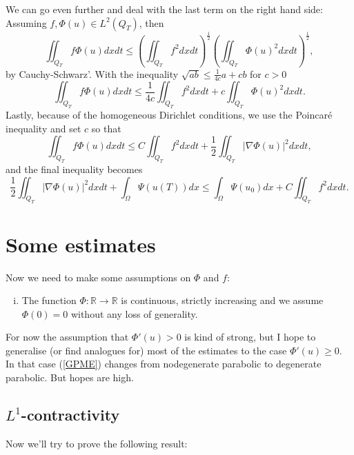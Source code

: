 \documentclass[11pt, a4paper]{article}
\begin{document}
\begin{obs}
We can go even further and deal with the last term on the right hand side: Assuming $f,\Phi(u) \in L^2(Q_T)$, then
\begin{equation*}
\iint_{Q_T} f\Phi(u)dxdt \leq \left(\iint_{Q_T} f^2 dxdt\right)^\frac{1}{2}\left(\iint_{Q_T} \Phi(u)^2 dxdt\right)^\frac{1}{2},
\end{equation*}
by Cauchy-Schwarz'. With the inequality $\sqrt{ab} \leq \frac{1}{4c}a + cb$ for $c>0$
\begin{equation*}
\iint_{Q_T} f\Phi(u)dxdt \leq \frac{1}{4c}\iint_{Q_T}f^2dxdt + c\iint_{Q_T}\Phi(u)^2dxdt.
\end{equation*}
Lastly, because of the homogeneous Dirichlet conditions, we use the Poincaré inequality and set $c$ so that
\begin{equation*}
\iint_{Q_T} f\Phi(u)dxdt \leq C\iint_{Q_T}f^2dxdt + \frac{1}{2}\iint_{Q_T}|\nabla \Phi(u)|^2dxdt,
\end{equation*}
and the final inequality becomes
\begin{equation}
\frac{1}{2}\iint_{Q_T}|\nabla \Phi(u)|^2dxdt + \int_\Omega \Psi(u(T))dx \leq \int_\Omega \Psi(u_0)dx + C\iint_{Q_T}f^2dxdt.
\end{equation}
\end{obs}
\section{Some estimates}
Now we need to make some assumptions on $\Phi$ and $f$:
\begin{enumerate}[i)]
	\item The function $\Phi: \mathbb{R} \to \mathbb{R}$ is continuous, strictly increasing and we assume $\Phi(0) = 0$ without any loss of generality.
\end{enumerate}

For now the assumption that $\Phi'(u) > 0$ is kind of strong, but I hope to generalise (or find analogues for) most of the estimates to the case $\Phi'(u) \geq 0$. In that case (\ref{GPME}) changes from nodegenerate parabolic to degenerate parabolic. But hopes are high.

\subsection{$L^1$-contractivity}
Now we'll try to prove the following result:
\end{document}
